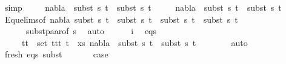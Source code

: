\begin{isabellebody}
\ simp\isanewline
\ \ \ \isamarkupfalse%
\ {\isachardoublequoteopen}nabla{}\ {\isasymturnstile}\ subst\ s{}\ t{}\ {\isasymapprox}\ subst\ s{}\ t{}{\isachardoublequoteclose}\ \isanewline
\ \ \ \ {\isachardoublequoteopen}nabla{}\ {\isasymturnstile}\ subst\ s{}\ t{}\ {\isasymapprox}\ subst\ s{}\ t{}{\isachardoublequoteclose}\isanewline
\ \ \ \ \isamarkupfalse%
\ Equ{\isacharunderscore}{\kern0pt}elims{\isacharparenleft}{\kern0pt}{}{\isacharparenright}{\kern0pt}{\isacharbrackleft}{\kern0pt}of\ nabla{}\ {\isacartoucheopen}{\isacharparenleft}{\kern0pt}subst\ s{}\ t{}{\isacharparenright}{\kern0pt}{\isacartoucheclose}\ \ {\isacartoucheopen}{\isacharparenleft}{\kern0pt}subst\ s{}\ t{}{\isacharparenright}{\kern0pt}{\isacartoucheclose}\ \ {\isacartoucheopen}{\isacharparenleft}{\kern0pt}subst\ s{}\ t{}{\isacharparenright}{\kern0pt}{\isacartoucheclose}\ \ {\isacartoucheopen}{\isacharparenleft}{\kern0pt}subst\ s{}\ t{}{\isacharparenright}{\kern0pt}{\isacartoucheclose}{\isacharbrackright}{\kern0pt}\ \isanewline
\ \ \ \ \ \ subst{\isacharunderscore}{\kern0pt}paar{\isacharbrackleft}{\kern0pt}of\ s{}{\isacharbrackright}{\kern0pt}\ \isamarkupfalse%
\ auto{\isacharplus}{\kern0pt}\isanewline
\ \ \ \ \isamarkupfalse%
\ i\ \isamarkupfalse%
\ eqs{\isacharcolon}{\kern0pt}\isanewline
\ \ \ \ {\isachardoublequoteopen}{\isasymforall}\ {\isacharparenleft}{\kern0pt}t{}{\isacharcomma}{\kern0pt}t{}{\isacharparenright}{\kern0pt}\ {\isasymin}\ set\ {\isacharparenleft}{\kern0pt}{\isacharparenleft}{\kern0pt}t{}{\isacharcomma}{\kern0pt}t{}{\isacharparenright}{\kern0pt}{\isacharhash}{\kern0pt}{\isacharparenleft}{\kern0pt}t{}{\isacharcomma}{\kern0pt}\ t{}{\isacharparenright}{\kern0pt}\ {\isacharhash}{\kern0pt}\ xs{\isacharparenright}{\kern0pt}{\isachardot}{\kern0pt}\ nabla{}\ {\isasymturnstile}\ subst\ s{}\ t{}\ {\isasymapprox}\ subst\ s{}\ t{}{\isachardoublequoteclose}\isanewline
\ \ \ \ \ \ \isamarkupfalse%
\ auto\isanewline
\isanewline
\ \ \ \ \isamarkupfalse%
\ fresh\ eqs\ subst\ \isanewline
\ \ \ \ \isamarkupfalse%
\ {\isacharquery}{\kern0pt}case\ \isamarkupfalse%

\end{isabellebody}

